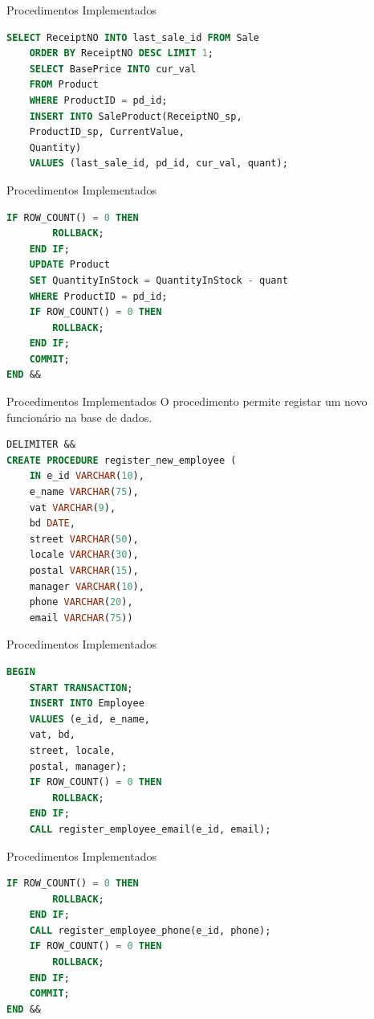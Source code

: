 \documentclass[compress,svgnames,handout,13.7pt]{beamer}
\begin{document}
\begin{frame}[fragile]{Procedimentos Implementados}
\begin{lstlisting}[language=sql]
    SELECT ReceiptNO INTO last_sale_id FROM Sale
    ORDER BY ReceiptNO DESC LIMIT 1;
    SELECT BasePrice INTO cur_val
    FROM Product
    WHERE ProductID = pd_id;
    INSERT INTO SaleProduct(ReceiptNO_sp,
    ProductID_sp, CurrentValue,
    Quantity) 
    VALUES (last_sale_id, pd_id, cur_val, quant);
\end{lstlisting}
\end{frame}
\begin{frame}[fragile]{Procedimentos Implementados}
\begin{lstlisting}[language=sql]
    IF ROW_COUNT() = 0 THEN
		ROLLBACK;
    END IF;
    UPDATE Product
    SET QuantityInStock = QuantityInStock - quant
    WHERE ProductID = pd_id;
    IF ROW_COUNT() = 0 THEN
		ROLLBACK;
    END IF;
    COMMIT;
END &&
\end{lstlisting}
\end{frame}

\begin{frame}[fragile]{Procedimentos Implementados}
O procedimento permite registar um novo funcionário na base de dados.
\begin{lstlisting}[language=sql]
DELIMITER &&
CREATE PROCEDURE register_new_employee (
    IN e_id VARCHAR(10), 
    e_name VARCHAR(75),
    vat VARCHAR(9), 
    bd DATE, 
    street VARCHAR(50), 
    locale VARCHAR(30),
	postal VARCHAR(15), 
    manager VARCHAR(10),
    phone VARCHAR(20), 
    email VARCHAR(75))
\end{lstlisting}
\end{frame}
\begin{frame}[fragile]{Procedimentos Implementados}
\begin{lstlisting}[language=sql]
BEGIN
    START TRANSACTION;
    INSERT INTO Employee
    VALUES (e_id, e_name, 
    vat, bd, 
    street, locale, 
    postal, manager);
    IF ROW_COUNT() = 0 THEN
		ROLLBACK;
    END IF;
    CALL register_employee_email(e_id, email);
\end{lstlisting}
\end{frame}
\begin{frame}[fragile]{Procedimentos Implementados}
\begin{lstlisting}[language=sql]
    IF ROW_COUNT() = 0 THEN
		ROLLBACK;
    END IF;
    CALL register_employee_phone(e_id, phone);
    IF ROW_COUNT() = 0 THEN
		ROLLBACK;
    END IF;
    COMMIT;
END &&
\end{lstlisting}
\end{frame}
\end{document}
